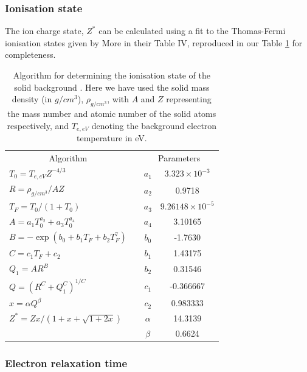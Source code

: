 \documentclass[12pt]{article}
\numberwithin{equation}{section}
\begin{document}
\subsubsection{Ionisation state}

The ion charge state, $Z^*$ can be calculated using a fit to the Thomas-Fermi ionisation states given by More \cite{eta:More} in their Table IV, reproduced in our Table \ref{table:Ionisation} for completeness.

\begin{table}[h!]
\centering
\begin{tabular}{l c c c}
\cline{1-1}
\cline{3-4}
\multicolumn{1}{c}{Algorithm} & & \multicolumn{2}{c}{Parameters} \\
\cline{1-1}
\cline{3-4}
$T_0=T_{e,eV}Z^{-4/3}$ & & $a_1$ & $3.323\times10^{-3}$ \\
$R=\rho_{g/cm^3}/AZ$ & & $a_2$ & 0.9718 \\ 
$T_F = T_0/(1 + T_0)$ & & $a_3$ & $9.26148\times10^{-5}$ \\
$A = a_1 T_0^{a_2} + a_3 T_0 ^{a_4}$ & & $a_4$ & 3.10165 \\ 
$B = -\exp(b_0 + b_1T_F + b_2T_F^7)$ & & $b_0$ & -1.7630 \\
$C = c_1 T_F + c_2$ & & $b_1$ & 1.43175 \\
$Q_1 = AR^B$ & & $b_2$ & 0.31546 \\ 
$Q = (R^C + Q_1^C)^{1/C}$ & & $c_1$ & -0.366667 \\
$x = \alpha Q^\beta$  & & $c_2$ & 0.983333 \\
$Z^* = Zx/(1+x+\sqrt{1+2x})$ & & $\alpha$ & 14.3139\\
\cline{1-1}
                             & & $\beta$ & 0.6624\\
\cline{3-4}
\end{tabular}
\caption{Algorithm for determining the ionisation state of the solid background \cite{eta:More}. Here we have used the solid mass density (in $g/cm^3$), $\rho_{g/cm^3}$, with $A$ and $Z$ representing the mass number and atomic number of the solid atoms respectively, and $T_{e,eV}$ denoting the background electron temperature in eV.}
\label{table:Ionisation} 
\end{table}

\subsubsection{Electron relaxation time}
\end{document}
